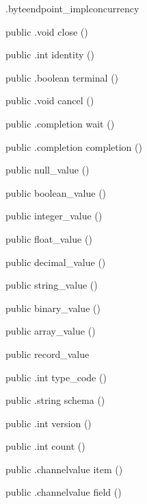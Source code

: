\begin{CrexxClass}{.byteendpoint\_impl}{concurrency}
\begin{Members}
    \Method
      {public}
      {.void}
      {close}
      {()}

    \Method
      {public}
      {.int}
      {identity}
      {()}

    \Method
      {public}
      {.boolean}
      {terminal}
      {()}

    \Method
      {public}
      {.void}
      {cancel}
      {()}

    \Method
      {public}
      {.completion}
      {wait}
      {()}

    \Method
      {public}
      {.completion}
      {completion}
      {()}

    \Factory
      {public}
      {null\_value}
      {()}

    \Factory
      {public}
      {boolean\_value}
      {()}

    \Factory
      {public}
      {integer\_value}
      {()}

    \Factory
      {public}
      {float\_value}
      {()}

    \Factory
      {public}
      {decimal\_value}
      {()}

    \Factory
      {public}
      {string\_value}
      {()}

    \Factory
      {public}
      {binary\_value}
      {()}

    \Factory
      {public}
      {array\_value}
      {()}

    \Factory
      {public}
      {record\_value}
      {}

    \Method
      {public}
      {.int}
      {type\_code}
      {()}

    \Method
      {public}
      {.string}
      {schema}
      {()}

    \Method
      {public}
      {.int}
      {version}
      {()}

    \Method
      {public}
      {.int}
      {count}
      {()}

    \Method
      {public}
      {.channelvalue}
      {item}
      {()}

    \Method
      {public}
      {.channelvalue}
      {field}
      {()}


\end{Members}
\end{CrexxClass}
